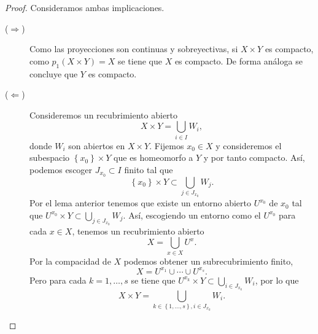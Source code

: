 \begin{proof}
Consideramos ambas implicaciones.
\begin{description}
\item[($\displaystyle \Rightarrow $)] Como las proyecciones son continuas y sobreyectivas, si $\displaystyle X \times Y $ es compacto, como $\displaystyle p_{1}\left(X \times Y\right)= X $ se tiene que $\displaystyle X $ es compacto. De forma análoga se concluye que $\displaystyle Y $ es compacto. 
\item[($\displaystyle \Leftarrow $)] Consideremos un recubrimiento abierto 
	\[X \times Y = \bigcup_{i \in I}W_{i} ,\]
	donde $\displaystyle W_{i} $ son abiertos en $\displaystyle X \times Y $. Fijemos $\displaystyle x_{0}\in X $ y consideremos el subespacio $\displaystyle \left\{ x_{0}\right\} \times Y $ que es homeomorfo a $\displaystyle Y $ y por tanto compacto. Así, podemos escoger $\displaystyle J_{x_{0}}\subset I $ finito tal que 
	\[ \left\{ x_{0}\right\} \times Y \subset \bigcup_{j \in J_{x_{0}}}W_{j} .\]
	Por el lema anterior tenemos que existe un entorno abierto $\displaystyle U^{x_{0}} $ de $\displaystyle x_{0} $ tal que $\displaystyle U^{x_{0}}\times Y \subset \bigcup_{j \in J_{x_{0}}}W_{j} $. Así, escogiendo un entorno como el $\displaystyle U^{x_{0}} $ para cada $\displaystyle x \in X $, tenemos un recubrimiento abierto 
	\[X = \bigcup_{x \in X}U^{x} .\]
	Por la compacidad de $\displaystyle X $ podemos obtener un subrecubrimiento finito,
	\[X = U^{x_{1}} \cup \cdots \cup U^{x_{s}} .\]
	Pero para cada $\displaystyle k = 1, \ldots, s $ se tiene que $\displaystyle U^{x_{k}}\times Y \subset \bigcup_{i \in J_{x_{k}}}W_{i} $, por lo que 
	\[X \times Y = \bigcup_{k \in \left\{ 1, \ldots, s\right\} , i \in J_{x_{k}}}W_{i} .\]
\end{description}
\end{proof}
